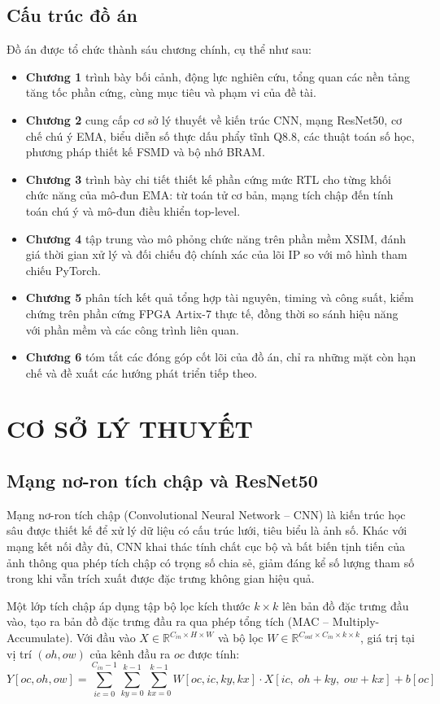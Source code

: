 \documentclass{uetgraduation}
\begin{document}
\section{Cấu trúc đồ án}
Đồ án được tổ chức thành sáu chương chính, cụ thể như sau:
\begin{itemize}
    \item \textbf{Chương 1} trình bày bối cảnh, động lực nghiên cứu, tổng quan các nền tảng tăng tốc phần cứng, cùng mục tiêu và phạm vi của đề tài.
    \item \textbf{Chương 2} cung cấp cơ sở lý thuyết về kiến trúc CNN, mạng ResNet50, cơ chế chú ý EMA, biểu diễn số thực dấu phẩy tĩnh Q8.8, các thuật toán số học, phương pháp thiết kế FSMD và bộ nhớ BRAM.
    \item \textbf{Chương 3} trình bày chi tiết thiết kế phần cứng mức RTL cho từng khối chức năng của mô-đun EMA: từ toán tử cơ bản, mạng tích chập đến tính toán chú ý và mô-đun điều khiển top-level.
    \item \textbf{Chương 4} tập trung vào mô phỏng chức năng trên phần mềm XSIM, đánh giá thời gian xử lý và đối chiếu độ chính xác của lõi IP so với mô hình tham chiếu PyTorch.
    \item \textbf{Chương 5} phân tích kết quả tổng hợp tài nguyên, timing và công suất, kiểm chứng trên phần cứng FPGA Artix-7 thực tế, đồng thời so sánh hiệu năng với phần mềm và các công trình liên quan.
    \item \textbf{Chương 6} tóm tắt các đóng góp cốt lõi của đồ án, chỉ ra những mặt còn hạn chế và đề xuất các hướng phát triển tiếp theo.
\end{itemize}

\chapter{CƠ SỞ LÝ THUYẾT}

\section{Mạng nơ-ron tích chập và ResNet50}
Mạng nơ-ron tích chập (Convolutional Neural Network -- CNN) \cite{cnn_intro2015}
là kiến trúc học sâu được thiết kế để xử lý dữ liệu có cấu trúc lưới, tiêu biểu
là ảnh số. Khác với
mạng kết nối đầy đủ, CNN khai thác tính chất cục bộ và bất biến tịnh tiến của ảnh
thông qua phép tích chập có trọng số chia sẻ, giảm đáng kể số lượng tham số trong
khi vẫn trích xuất được đặc trưng không gian hiệu quả.

Một lớp tích chập áp dụng tập bộ lọc kích thước $k \times k$ lên bản đồ đặc trưng đầu
vào, tạo ra bản đồ đặc trưng đầu ra qua phép tổng tích (MAC -- Multiply-Accumulate). Với
đầu vào $X \in \mathbb{R}^{C_{in} \times H \times W}$ và bộ lọc
$W \in \mathbb{R}^{C_{out} \times C_{in} \times k \times k}$, giá trị tại vị trí
$(oh, ow)$ của kênh đầu ra $oc$ được tính:
\begin{equation}
    Y[oc, oh, ow] = \sum_{ic=0}^{C_{in}-1}\sum_{ky=0}^{k-1}\sum_{kx=0}^{k-1}
    W[oc, ic, ky, kx] \cdot X[ic,\; oh+ky,\; ow+kx] + b[oc]
\end{equation}
\end{document}
